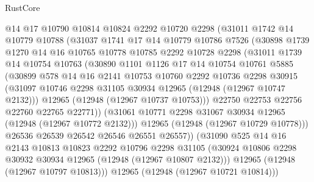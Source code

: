 \begin{lexlean}{RustCore}
\begin{coremodule}
              @14
              @17
              @10790
              @10814
              @10824
              @2292
              @10720
              @2298
              (@31011
                @1742
                @14
                @10779
                @10788
                (@31037
                  @1741
                  @17
                  @14
                  @10779
                  @10786
                  @7526
                  (@30898
                    @1739
                    @1270
                    @14
                    @16
                    @10765
                    @10778
                    @10785
                    @2292
                    @10728
                    @2298
                    (@31011
                      @1739
                      @14
                      @10754
                      @10763
                      (@30890
                        @1101
                        @1126
                        @17
                        @14
                        @10754
                        @10761
                        @5885
                        (@30899
                          @578
                          @14
                          @16
                          @2141
                          @10753
                          @10760
                          @2292
                          @10736
                          @2298
                          @30915
                          (@31097 @10746 @2298 @31105 @30934 @12965 (@12948 (@12967 @10747 @2132)))
                          @12965
                          (@12948 (@12967 @10737 @10753)))
                        @22750
                        @22753
                        @22756
                        @22760
                        @22765
                        @22771))
                    (@31061 @10771 @2298 @31067 @30934 @12965 (@12948 (@12967 @10772 @2132)))
                    @12965
                    (@12948 (@12967 @10729 @10778)))
                  @26536
                  @26539
                  @26542
                  @26546
                  @26551
                  @26557))
              (@31090
                @525
                @14
                @16
                @2143
                @10813
                @10823
                @2292
                @10796
                @2298
                @31105
                (@30924 @10806 @2298 @30932 @30934 @12965 (@12948 (@12967 @10807 @2132)))
                @12965
                (@12948 (@12967 @10797 @10813)))
              @12965
              (@12948 (@12967 @10721 @10814)))

\end{coremodule}
\end{lexlean}
